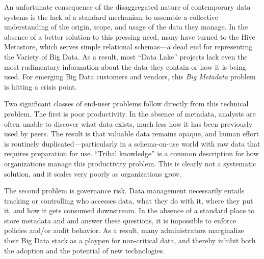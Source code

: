 \documentclass{sig-alternate}
\begin{document}
An unfortunate consequence of the disaggregated nature of contemporary data systems
is the lack of a standard mechanism
to assemble a collective understanding of the origin, scope, and usage of the data they manage.
In the absence of a better solution to this pressing need,
many have turned to the 
Hive Metastore, which serves simple relational schemas---a dead end for representing the Variety of Big Data. 
As a result, most ``Data Lake'' projects lack 
even the most rudimentary information about the data they contain or how it is being used. 
For emerging Big Data customers and vendors, this \emph{Big Metadata} problem is hitting a crisis point.  

Two significant classes of end-user problems follow directly from this technical problem.
The first is poor productivity.
In the absence of metadata, analysts are often unable to discover what data exists, much less how it has been previously used by peers. The result is that valuable data remains opaque, and human effort is routinely duplicated---particularly in a schema-on-use world with raw data that requires preparation for use.
``Tribal knowledge'' is a common description for how organizations manage this productivity problem. This is clearly not a systematic solution, and it scales very poorly as organizations grow.

The second problem is governance risk. Data management necessarily entails tracking or controlling who accesses data, what they do with it, where they put it, and how it gets consumed downstream. 
In the absence of a standard place to store metadata and and answer these questions, it is impossible to enforce policies and/or audit behavior. As a result, many administrators marginalize their Big Data stack as a playpen for non-critical data, and thereby inhibit both the adoption and the potential of new technologies.
\end{document}
